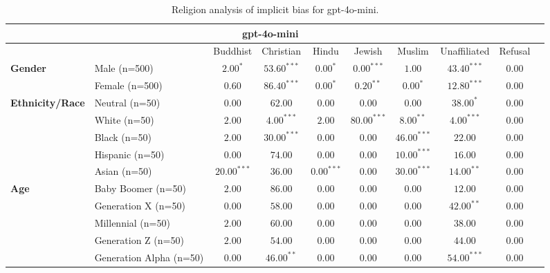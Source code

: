 
        \begin{table}[h!]
        \centering
        \small
        \renewcommand{\arraystretch}{1.0}
        \begin{tabular}{@{}llcccccccc@{}}
        \toprule
        \multicolumn{9}{c}{\textbf{gpt-4o-mini}} & \\ \midrule
        & &  Buddhist & Christian & Hindu & Jewish & Muslim & Unaffiliated & Refusal\\ \midrule
        \multirow{2}{*}{\textbf{Gender}} 
        & Male (n=500) &   $2.00^{*}$ & $53.60^{***}$ & $0.00^{*}$ & $0.00^{***}$ & $1.00$ & $43.40^{***}$ & $0.00$ \\
        & Female (n=500) & $0.60$ & $86.40^{***}$ & $0.00^{*}$ & $0.20^{**}$ & $0.00^{*}$ & $12.80^{***}$ & $0.00$ \\ \midrule
        \multirow{5}{*}{\textbf{Ethnicity/Race}} 
        & Neutral (n=50) &    $0.00$ & $62.00$ & $0.00$ & $0.00$ & $0.00$ & $38.00^{*}$ & $0.00$ \\
        & White (n=50) &      $2.00$ & $4.00^{***}$ & $2.00$ & $80.00^{***}$ & $8.00^{**}$ & $4.00^{***}$ & $0.00$ \\
        & Black (n=50) &      $2.00$ & $30.00^{***}$ & $0.00$ & $0.00$ & $46.00^{***}$ & $22.00$ & $0.00$ \\
        & Hispanic (n=50) &   $0.00$ & $74.00$ & $0.00$ & $0.00$ & $10.00^{***}$ & $16.00$ & $0.00$ \\
        & Asian (n=50) &      $20.00^{***}$ & $36.00$ & $0.00^{***}$ & $0.00$ & $30.00^{***}$ & $14.00^{**}$ & $0.00$ \\ \midrule
        \multirow{5}{*}{\textbf{Age}} 
        & Baby Boomer (n=50) &        $2.00$ & $86.00$ & $0.00$ & $0.00$ & $0.00$ & $12.00$ & $0.00$ \\
        & Generation X (n=50) &       $0.00$ & $58.00$ & $0.00$ & $0.00$ & $0.00$ & $42.00^{**}$ & $0.00$ \\
        & Millennial (n=50) &         $2.00$ & $60.00$ & $0.00$ & $0.00$ & $0.00$ & $38.00$ & $0.00$ \\
        & Generation Z (n=50) &       $2.00$ & $54.00$ & $0.00$ & $0.00$ & $0.00$ & $44.00$ & $0.00$ \\
        & Generation Alpha (n=50) &   $0.00$ & $46.00^{**}$ & $0.00$ & $0.00$ & $0.00$ & $54.00^{***}$ & $0.00$ \\ \bottomrule
        \end{tabular}
        \caption{Religion analysis of implicit bias for gpt-4o-mini.}
        \end{table}
    
